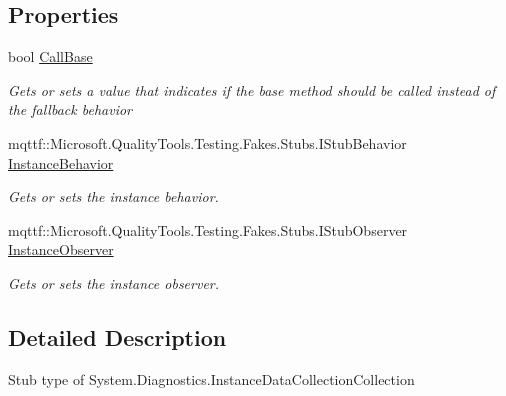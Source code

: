 \subsection*{Properties}
\begin{DoxyCompactItemize}
\item 
bool \hyperlink{class_system_1_1_diagnostics_1_1_fakes_1_1_stub_instance_data_collection_collection_a5f76a80e4cb8efdd552c48dced95e288}{Call\-Base}
\begin{DoxyCompactList}\small\item\em Gets or sets a value that indicates if the base method should be called instead of the fallback behavior\end{DoxyCompactList}\item 
mqttf\-::\-Microsoft.\-Quality\-Tools.\-Testing.\-Fakes.\-Stubs.\-I\-Stub\-Behavior \hyperlink{class_system_1_1_diagnostics_1_1_fakes_1_1_stub_instance_data_collection_collection_a0b38779c2b3afe26887773dc2e02f00e}{Instance\-Behavior}
\begin{DoxyCompactList}\small\item\em Gets or sets the instance behavior.\end{DoxyCompactList}\item 
mqttf\-::\-Microsoft.\-Quality\-Tools.\-Testing.\-Fakes.\-Stubs.\-I\-Stub\-Observer \hyperlink{class_system_1_1_diagnostics_1_1_fakes_1_1_stub_instance_data_collection_collection_a3728e2ae992e6e564574477385fe1fcb}{Instance\-Observer}
\begin{DoxyCompactList}\small\item\em Gets or sets the instance observer.\end{DoxyCompactList}\end{DoxyCompactItemize}


\subsection{Detailed Description}
Stub type of System.\-Diagnostics.\-Instance\-Data\-Collection\-Collection



